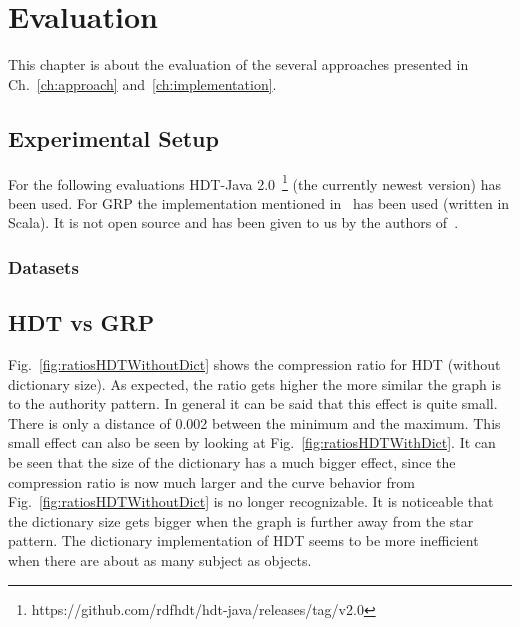 \chapter{Evaluation}\label{ch:evaluation}

This chapter is about the evaluation of the several approaches presented in Ch.~\ref{ch:approach} and~\ref{ch:implementation}.

\section{Experimental Setup}

For the following evaluations HDT-Java 2.0~\footnote{\label{foot:1}https://github.com/rdfhdt/hdt-java/releases/tag/v2.0} (the currently newest version) has been used. For GRP the implementation mentioned in~\cite{maneth} has been used (written in Scala). It is not open source and has been given to us by the authors of~\cite{maneth}.

\subsection{Datasets}

\section{HDT vs GRP}\label{sec:evaluationHDTvsGRP}


Fig.~\ref{fig:ratiosHDTWithoutDict} shows the compression ratio for HDT (without dictionary size). As expected, the ratio gets higher the more similar the graph is to the authority pattern. In general it can be said that this effect is quite small. There is only a distance of 0.002 between the minimum and the maximum. This small effect can also be seen by looking at Fig.~\ref{fig:ratiosHDTWithDict}. It can be seen that the size of the dictionary has a much bigger effect, since the compression ratio is now much larger and the curve behavior from Fig.~\ref{fig:ratiosHDTWithoutDict} is no longer recognizable. It is noticeable that the dictionary size gets bigger when the graph is further away from the star pattern. The dictionary implementation of HDT seems to be more inefficient when there are about as many subject as objects. 


